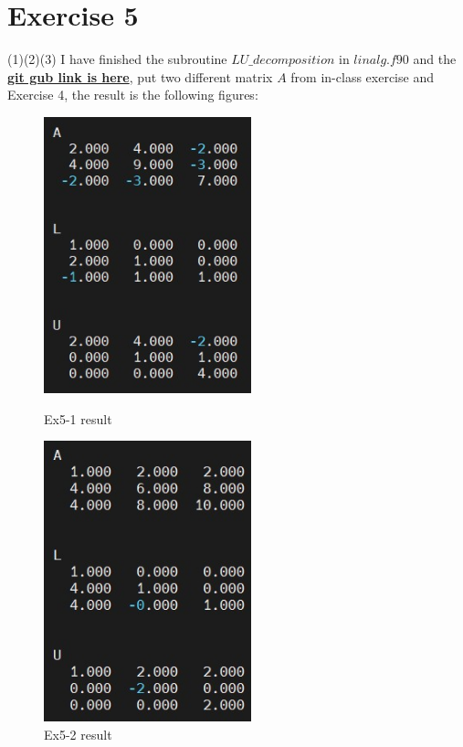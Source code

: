 \documentclass[aps,12pt,prd,nofootinbib,bibnotes, amsmath,amssymb,showpacs,superscriptaddress,floatfix]{revtex4-2}
\begin{document}
\section{Exercise 5}
(1)(2)(3) I have finished the subroutine $LU \_ decomposition$ in $linalg.f90$ and the  \href{https://github.com/kuo1235/Computational-Astrophysics-2022/blob/main/astr660/week6/exercise/L6exercise/linalg.f90}{\bf{git gub link is here}}, put two different matrix $A$ from in-class exercise and Exercise 4, the result is the following figures: 
\begin{figure}[htbp]
\centering
\begin{minipage}[t]{0.48\textwidth}
\centering
\includegraphics[width=6cm]{EX5_1}
\caption{Ex5-1 result}
\end{minipage}
\begin{minipage}[t]{0.48\textwidth}
\centering
\includegraphics[width=6cm]{EX5_2}
\caption{Ex5-2 result}
\end{minipage}
\end{figure}
\end{document}
